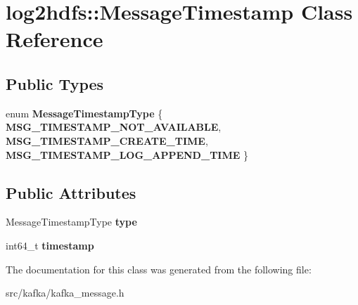 \hypertarget{classlog2hdfs_1_1MessageTimestamp}{}\section{log2hdfs\+:\+:Message\+Timestamp Class Reference}
\label{classlog2hdfs_1_1MessageTimestamp}
\subsection*{Public Types}
\begin{DoxyCompactItemize}
\item 
enum {\bfseries Message\+Timestamp\+Type} \{ {\bfseries M\+S\+G\+\_\+\+T\+I\+M\+E\+S\+T\+A\+M\+P\+\_\+\+N\+O\+T\+\_\+\+A\+V\+A\+I\+L\+A\+B\+LE}, 
{\bfseries M\+S\+G\+\_\+\+T\+I\+M\+E\+S\+T\+A\+M\+P\+\_\+\+C\+R\+E\+A\+T\+E\+\_\+\+T\+I\+ME}, 
{\bfseries M\+S\+G\+\_\+\+T\+I\+M\+E\+S\+T\+A\+M\+P\+\_\+\+L\+O\+G\+\_\+\+A\+P\+P\+E\+N\+D\+\_\+\+T\+I\+ME}
 \}\hypertarget{classlog2hdfs_1_1MessageTimestamp_ad63eeb31fb453a5c06fbc02a56798f11}{}\label{classlog2hdfs_1_1MessageTimestamp_ad63eeb31fb453a5c06fbc02a56798f11}

\end{DoxyCompactItemize}
\subsection*{Public Attributes}
\begin{DoxyCompactItemize}
\item 
Message\+Timestamp\+Type {\bfseries type}\hypertarget{classlog2hdfs_1_1MessageTimestamp_a67265744579b0440cb90cc1b888fd78c}{}\label{classlog2hdfs_1_1MessageTimestamp_a67265744579b0440cb90cc1b888fd78c}

\item 
int64\+\_\+t {\bfseries timestamp}\hypertarget{classlog2hdfs_1_1MessageTimestamp_a06bcb12f48b1809ede95a3cddc2b3fc7}{}\label{classlog2hdfs_1_1MessageTimestamp_a06bcb12f48b1809ede95a3cddc2b3fc7}

\end{DoxyCompactItemize}


The documentation for this class was generated from the following file\+:\begin{DoxyCompactItemize}
\item 
src/kafka/kafka\+\_\+message.\+h\end{DoxyCompactItemize}
